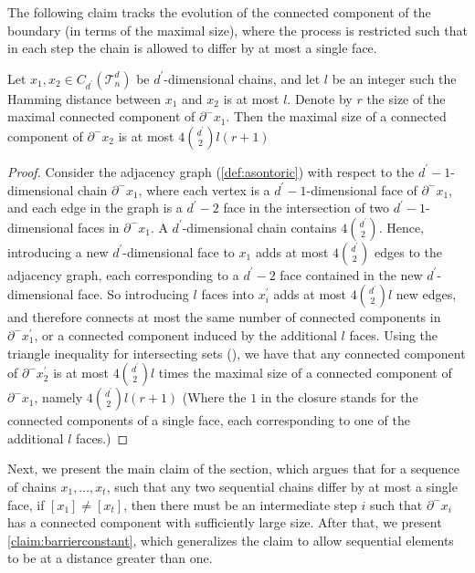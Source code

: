 The following claim tracks the evolution of the connected component of the boundary (in terms of the maximal size), where the process is restricted such that in each step the chain is allowed to differ by at most a single face.
\begin{claim}
  \label{claim:mergebyf}
  Let $x_{1},x_{2} \in C_{d^{\prime}}(\mathcal{T}_n^d)$ be $d^{\prime}$-dimensional chains, and let $l$ be an integer such the Hamming distance between $x_{1}$ and $x_{2}$ is at most $l$. Denote by $r$ the size of the maximal connected component of $\partial^{-}x_{1}$. Then the maximal size of a connected component of $\partial^{-}x_{2}$ is at most $4{ d^{\prime} \choose 2 }l(r+1) $
\end{claim}
\begin{proof}
  Consider the adjacency graph (\cref{def:asontoric}) with respect to the $d^{\prime}-1$-dimensional chain $\partial^{-}x_{1}$, where each vertex is a $d^{\prime}-1$-dimensional face of $\partial^{-}x_{1}$, and each edge in the graph is a $d^{\prime}-2$ face in the intersection of two $d^{\prime}-1$-dimensional faces in $\partial^{-}x_{1}$. A $d^{\prime}$-dimensional chain contains $4{ d^{\prime} \choose 2 }$. Hence, introducing a new $d^{\prime}$-dimensional face to $x_{1}$ adds at most $4{ d^{\prime} \choose 2 }$ edges to the adjacency graph, each corresponding to a $d^{\prime}-2$ face contained in the new $d^{\prime}$-dimensional face. So introducing $l$ faces into $x^{\prime}_{i}$ adds at most $4 { d^{\prime} \choose 2 } l$ new edges, and therefore connects at most the same number of connected components in $\partial^{-}x^{\prime}_{1}$, or a connected component induced by the additional $l$ faces. Using the triangle inequality for intersecting sets (), we have that any connected component of $\partial^{-}x_{2}^{\prime}$ is at most $4{ d^{\prime} \choose 2 } l$ times the maximal size of a connected component of $\partial^{-}x_{1}$, namely $4 { d^{\prime} \choose 2 }l (r+1)$ (Where the $1$ in the closure stands for the connected components of a single face, each corresponding to one of the additional $l$ faces.)
\end{proof}




Next, we present the main claim of the section, which argues that for a sequence of chains $x_{1}, \ldots, x_{t}$, such that any two sequential chains differ by at most a single face, if $[x_{1}] \neq [x_{t}]$, then there must be an intermediate step $i$ such that $\partial^{-}x_{i}$ has a connected component with sufficiently large size. After that, we present \cref{claim:barrierconstant}, which generalizes the claim to allow sequential elements to be at a distance greater than one.

